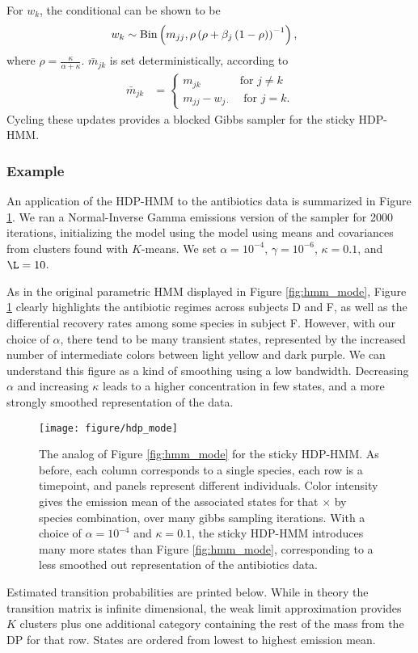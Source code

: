 \documentclass[14pt]{extarticle}
\begin{document}
For $w_k$, the conditional can be shown to be
\begin{align*}
  w_k &\sim \textnormal{Bin}\left(m_{jj}, \rho\left(\rho + \beta_j\left(1 - \rho\right)\right)^{-1}\right),
\end{align*}
where $\rho = \frac{\kappa}{\alpha + \kappa}$. $\bar{m}_{jk}$ is set
deterministically, according to
\begin{align*}
  \bar{m}_{jk} &= \begin{cases}
    m_{jk} &\text{for } j \neq k\\
    m_{jj} - w_{j \cdot} &\text{ for } j = k.
  \end{cases}
\end{align*}
Cycling these updates provides a blocked Gibbs sampler for the sticky HDP-HMM.

\subsubsection{Example}
\label{subsubsec:sticky_hdp_hmm_example}

An application of the HDP-HMM to the antibiotics data is summarized in Figure
\ref{fig:hdp_mode}. We ran a Normal-Inverse Gamma emissions version of the
sampler for 2000 iterations, initializing the model using the model using means
and covariances from clusters found with $K$-means. We set $\alpha = 10^{-4}$,
$\gamma = 10^{-6}$, $\kappa = 0.1$, and $\L = 10$.

As in the original parametric HMM displayed in Figure \ref{fig:hmm_mode}, Figure
\ref{fig:hdp_mode} clearly highlights the antibiotic regimes across subjects D
and F, as well as the differential recovery rates among some species in subject
F. However, with our choice of $\alpha$, there tend to be many transient states,
represented by the increased number of intermediate colors between light yellow
and dark purple. We can understand this figure as a kind of smoothing using a
low bandwidth. Decreasing $\alpha$ and increasing $\kappa$ leads to a higher
concentration in few states, and a more strongly smoothed representation of the
data.

\begin{figure}
  \centering
  \texttt{[image: figure/hdp\_mode]}
  \caption{
    The analog of Figure \ref{fig:hmm_mode} for the sticky HDP-HMM. As before,
    each column corresponds to a single species, each row is a timepoint, and
    panels represent different individuals. Color intensity gives the emission
    mean of the associated states for that $\times$ by species combination, over
    many gibbs sampling iterations. With a choice of $\alpha = 10^{-4}$ and
    $\kappa = 0.1$, the sticky HDP-HMM introduces many more states than Figure
    \ref{fig:hmm_mode}, corresponding to a less smoothed out representation of
    the antibiotics data. \label{fig:hdp_mode} }
\end{figure}
Estimated transition probabilities are printed below. While in theory the
transition matrix is infinite dimensional, the weak limit approximation provides
$K$ clusters plus one additional category containing the rest of the mass from
the DP for that row. States are ordered from lowest to highest emission mean.
\end{document}
